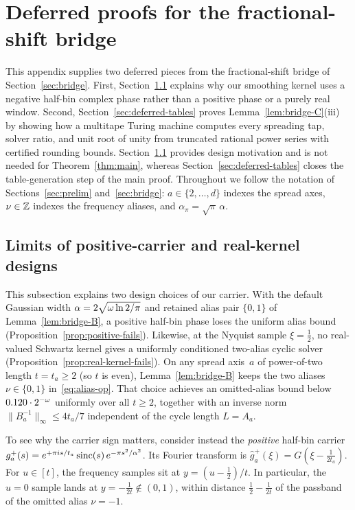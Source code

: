 \section{Deferred proofs for the fractional-shift bridge}\label{app:deferred}

This appendix supplies two deferred pieces from the fractional-shift bridge of Section~\ref{sec:bridge}. First, Section~\ref{sec:bridge-negative} explains why our smoothing kernel uses a negative half-bin complex phase rather than a positive phase or a purely real window. Second, Section~\ref{sec:deferred-tables} proves Lemma~\ref{lem:bridge-C}(iii) by showing how a multitape Turing machine computes every spreading tap, solver ratio, and unit root of unity from truncated rational power series with certified rounding bounds. Section~\ref{sec:bridge-negative} provides design motivation and is not needed for Theorem~\ref{thm:main}, whereas Section~\ref{sec:deferred-tables} closes the table-generation step of the main proof. Throughout we follow the notation of Sections~\ref{sec:prelim} and~\ref{sec:bridge}: $a\in\{2,\dots,d\}$ indexes the spread axes, $\nu\in\mathbb{Z}$ indexes the frequency aliases, and $\alpha_\pi=\sqrt\pi\,\alpha$.

\subsection{Limits of positive-carrier and real-kernel designs}\label{sec:bridge-negative}

This subsection explains two design choices of our carrier. With the default Gaussian width $\alpha=2\sqrt{\omega\ln 2/\pi}$ and retained alias pair $\{0,1\}$ of Lemma~\ref{lem:bridge-B}, a positive half-bin phase loses the uniform alias bound (Proposition~\ref{prop:positive-fails}). Likewise, at the Nyquist sample $\xi=\tfrac12$, no real-valued Schwartz kernel gives a uniformly conditioned two-alias cyclic solver (Proposition~\ref{prop:real-kernel-fails}). On any spread axis~$a$ of power-of-two length $t=t_a\ge 2$ (so $t$ is even), Lemma~\ref{lem:bridge-B} keeps the two aliases $\nu\in\{0,1\}$ in~\eqref{eq:alias-op}. That choice achieves an omitted-alias bound below $0.120\cdot 2^{-\omega}$ uniformly over all $t\ge 2$, together with an inverse norm $\|B_a^{-1}\|_\infty\le 4t_a/7$ independent of the cycle length $L=A_a$.

To see why the carrier sign matters, consider instead the \emph{positive} half-bin carrier $g_a^+(s)=e^{+\pi i s/t_a}\operatorname{sinc}(s)\,e^{-\pi s^2/\alpha^2}$. Its Fourier transform is $\hat g_a^+(\xi)=G(\xi-\frac{1}{2t_a})$. For $u\in[t]$, the frequency samples sit at $y=(u-\tfrac12)/t$. In particular, the $u=0$ sample lands at $y=-\frac{1}{2t}\notin(0,1)$, within distance $\tfrac12-\frac{1}{2t}$ of the passband of the omitted alias $\nu=-1$.

